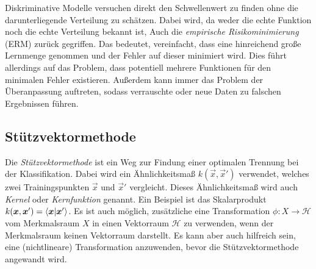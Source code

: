 		Diskriminative Modelle versuchen direkt den Schwellenwert zu finden ohne die darunterliegende Verteilung zu schätzen. Dabei wird, da weder die echte Funktion noch die echte Verteilung bekannt ist, Auch die \emph{empirische Risikominimierung} (ERM) zurück gegriffen. Das bedeutet, vereinfacht, dass eine hinreichend große Lernmenge genommen und der Fehler auf dieser minimiert wird. Dies führt allerdings auf das Problem, dass potentiell mehrere Funktionen für den minimalen Fehler existieren. Außerdem kann immer das Problem der Überanpassung auftreten, sodass verrauschte oder neue Daten zu falschen Ergebnissen führen.

		\subsection{Stützvektormethode}
			Die \emph{Stützvektormethode} ist ein Weg zur Findung einer optimalen Trennung bei der Klassifikation. Dabei wird ein Ähnlichkeitsmaß \( k(\vec{x}, \vec{x}') \) verwendet, welches zwei Trainingspunkten \(\vec{x}\) und \(\vec{x}'\) vergleicht. Dieses Ähnlichkeitsmaß wird auch \emph{Kernel} oder \emph{Kernfunktion} genannt. Ein Beispiel ist das Skalarprodukt \( k(\bm{x}, \bm{x}') = \braket{\bm{x}}{\bm{x}'} \). Es ist auch möglich, zusätzliche eine Transformation \( \phi : X \to \mathcal{H} \) vom Merkmalsraum \(X\) in einen Vektorraum \(\mathcal{H}\) zu verwenden, \bspw wenn der Merkmalsraum keinen Vektorraum darstellt. Es kann aber auch hilfreich sein, eine (nichtlineare) Transformation anzuwenden, bevor	die Stützvektormethode angewandt wird.

